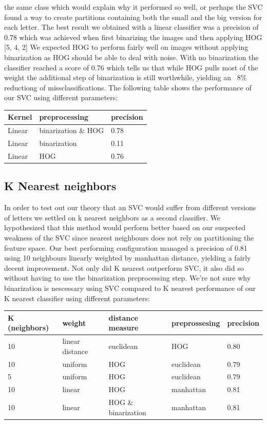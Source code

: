\documentclass[paper=a4, fontsize=11pt]{scrartcl} %
\numberwithin{equation}{section} %
\numberwithin{figure}{section} %
\numberwithin{table}{section} %
\begin{document}
the same class which would explain why it performed so well, or
perhaps the SVC found a way to create partitions containing both the
small and the big version for each letter.  The best result we
obtained with a linear classifier was a precision of 0.78 which was
achieved when first binarizing the images and then applying HOG %
[5, 4, 2] We expected HOG to perform fairly well on images without
applying binarization as HOG should be able to deal with noise.  With
no binarization the classifier reached a score of 0.76 which tells us
that while HOG pulls most of the weight the additional step of
binarization is still worthwhile, yielding an ~8\% reductiong of
missclassifications.  The following table shows the performance of our
SVC using different parameters:

\begin{tabular}{l | l | l}
    Kernel & preprocessing & precision\\ \hline
    Linear & binarization \& HOG & 0.78 \\ \hline
    Linear & binarization & 0.11 \\ \hline
    Linear & HOG & 0.76\\ \hline
\end{tabular}

\subsection{K Nearest neighbors}
In order to test out our theory that an SVC would suffer from
different versions of letters we settled on k nearest neighbors as a
second classifier.  We hypothesized that this method would perform
better based on our suspected weakness of the SVC since nearest
neighbours does not rely on partitioning the feature space.  Our best
performing configuration managed a precision of 0.81 using 10
neighbours linearly weighted by manhattan distance, yielding a fairly
decent improvement.  Not only did K nearest outperform SVC, it also
did so without having to use the binarization preprocessing step.
We're not sure why binarization is nescessary using SVC compared to K
nearest %
performance of our K nearest classifier using different parameters:
\begin{tabular}{l | l | l | l | l}
    K (neighbors) & weight & distance measure & preprossesing & precision\\ \hline
    10 & linear distance & euclidean & HOG & 0.80\\ \hline
    10 & uniform & HOG & euclidean & 0.79\\ \hline
    5 & uniform & HOG & euclidean & 0.79\\ \hline
    10 & linear & HOG & manhattan & 0.81\\ \hline
    10 & linear & HOG \& binarization & manhattan & 0.81\\ \hline
\end{tabular}
    

 
\end{document}
